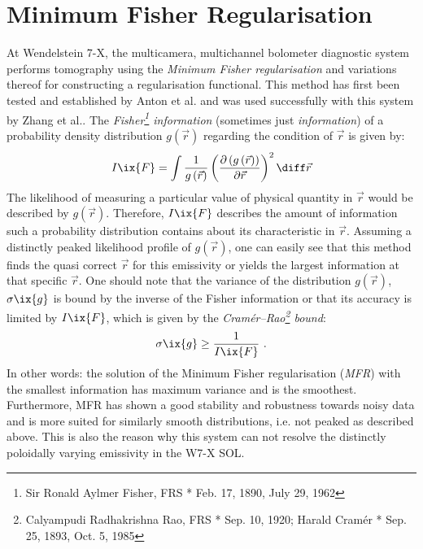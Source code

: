     \section{Minimum Fisher Regularisation}\label{sec:minfisher}%
%
        At Wendelstein 7-X, the multicamera, multichannel bolometer diagnostic system performs tomography using the \textit{Minimum Fisher regularisation} and variations thereof for constructing a regularisation functional. This method has first been tested and established by Anton et al.\cite{Anton1996} and was used successfully with this system by Zhang et al.\cite{Zhang2013}. The \textit{Fisher\footnote[1]{Sir Ronald Aylmer Fisher, FRS * Feb. 17, 1890, \textdagger July 29, 1962} information} (sometimes just \textit{information}) of a probability density distribution $g\left(\vec{r}\right)$ regarding the condition of $\vec{r}$ is given by:
%
        \begin{align}%
            I\ix{F}=\int\frac{1}{g\left(\vec{r}\right)}\left(\frac{\partial\left(g\left(\vec{r}\right)\right)}{\partial\vec{r}}\right)^{2}\diff\vec{r}%
        \end{align}\label{eq:fisherinfo}%
%
        The likelihood of measuring a particular value of physical quantity in $\vec{r}$ would be described by $g\left(\vec{r}\right)$. Therefore, $I\ix{F}$ describes the amount of information such a probability distribution contains about its characteristic in $\vec{r}$. Assuming a distinctly peaked likelihood profile of $g\left(\vec{r}\right)$, one can easily see that this method finds the quasi correct $\vec{r}$ for this emissivity or yields the largest information at that specific $\vec{r}$\cite{Fisher1922}. One should note that the variance of the distribution $g\left(\vec{r}\right)$, $\sigma\ix{g}$ is bound by the inverse of the Fisher information or that its accuracy is limited by $I\ix{F}$, which is given by the \textit{Cramér–Rao\footnote[2]{Calyampudi Radhakrishna Rao, FRS * Sep. 10, 1920; Harald Cramér * Sep. 25, 1893, \textdagger Oct. 5, 1985} bound}:%
%
        \begin{align}%
            \sigma\ix{g}\ge\frac{1}{I\ix{F}}\,\,.\nonumber%
        \end{align}%
%
        In other words: the solution of the Minimum Fisher regularisation (\textit{MFR}) with the smallest information has maximum variance and is the smoothest. Furthermore, MFR has shown a good stability and robustness towards noisy data and is more suited for similarly smooth distributions, i.e. not peaked as described above\cite{Frieden1988,Frieden2012}. This is also the reason why this system can not resolve the distinctly poloidally varying emissivity in the W7-X SOL.\\%
